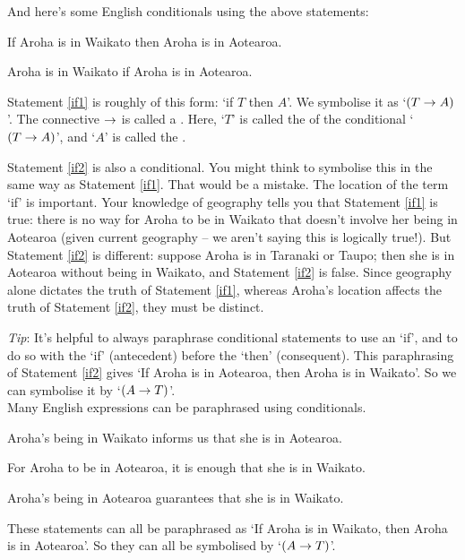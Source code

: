 \documentclass[PHIL101-Textbook.tex]{subfiles}
\begin{document}
\noindent And here's some English conditionals using the above statements:
\begin{earg}
\item[\ex{if1}] If Aroha is in Waikato then Aroha is in Aotearoa.
\item[\ex{if2}] Aroha is in Waikato if Aroha is in Aotearoa.
\end{earg}

	
\noindent Statement \ref{if1} is roughly of this form: `if $T$ then $A$'. We symbolise it as `$(T\rightarrow A)$'. The connective $\rightarrow $ is called a . Here, `$T$' is called the  of the conditional `$(T \rightarrow A)$', and `$A$' is called the .



\noindent Statement \ref{if2} is also a conditional. You might think to symbolise this in the same way as Statement \ref{if1}. That would be a mistake. The location of the term `if' is important. 
Your knowledge of geography tells you that Statement \ref{if1} is true: there is no way for Aroha to be in Waikato that doesn't involve her being in Aotearoa (given current geography -- we aren't saying this is logically true!). But Statement \ref{if2} is different: suppose Aroha is in Taranaki or Taupo; then she is in Aotearoa without being in Waikato, and Statement \ref{if2} is false. Since geography alone dictates the truth of Statement \ref{if1}, whereas Aroha's location affects the truth of Statement \ref{if2}, they must be distinct.

\emph{Tip}: It's helpful to always paraphrase conditional statements to use an `if', and to do so with the `if' (antecedent) before the `then' (consequent). This paraphrasing of Statement \ref{if2} gives `If Aroha is in Aotearoa, then Aroha is in Waikato'. So we can symbolise it by `$(A \rightarrow T)$'.\\


Many English expressions can be paraphrased using conditionals. 
	\begin{earg}
		\item[\ex{ifnec2}] Aroha's being in Waikato informs us that she is in Aotearoa. 
		\item[\ex{ifsuf1}] For Aroha to be in Aotearoa, it is enough that she is in Waikato.
		\item[\ex{ifsuf2}] Aroha's being in Aotearoa guarantees that she is in Waikato.
	\end{earg}
These statements can all be paraphrased as `If Aroha is in Waikato, then Aroha is in Aotearoa'. So they can all be symbolised by `$(A \rightarrow T)$'.
\end{document}
